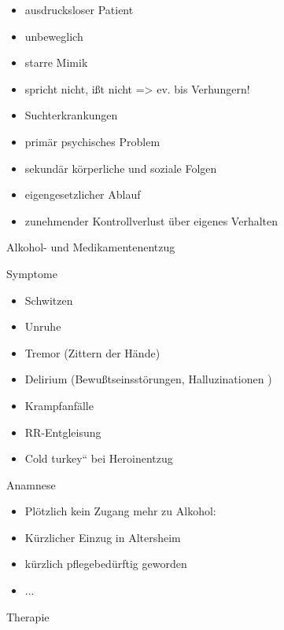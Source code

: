 \documentclass{article}
\begin{document}
\begin{itemize}
\item ausdrucksloser Patient

\item unbeweglich

\item starre Mimik

\item spricht nicht, i{\ss}t nicht ={\textgreater} ev. bis Verhungern!

\item Suchterkrankungen

\item prim\"ar psychisches Problem

\item sekund\"ar k\"orperliche und soziale Folgen

\item eigengesetzlicher Ablauf

\item zunehmender Kontrollverlust \"uber  eigenes Verhalten

\end{itemize}
Alkohol- und Medikamentenentzug

Symptome

\begin{itemize}
\item Schwitzen

\item Unruhe

\item Tremor  (Zittern der H\"ande)

\item Delirium  (Bewu{\ss}tseinsst\"orungen, Halluzinationen )

\item Krampfanf\"alle

\item RR-Entgleisung

\item {\quotedblbase}Cold turkey{\textquotedblleft} bei Heroinentzug

\end{itemize}
Anamnese

\begin{itemize}
\item Pl\"otzlich kein Zugang mehr zu Alkohol:

\item K\"urzlicher Einzug in Altersheim

\item k\"urzlich pflegebed\"urftig geworden

\item ...

\end{itemize}
Therapie
\end{document}
